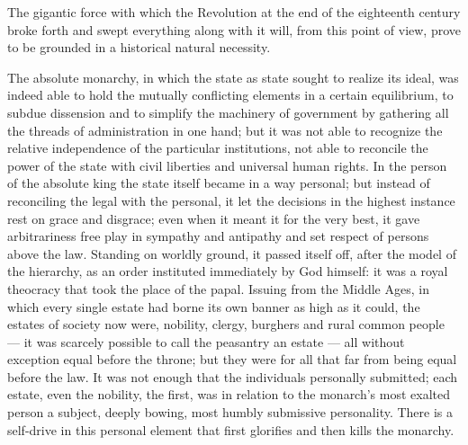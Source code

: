 \documentclass[12pt,a4paper,openany]{book}
\newcommand{\opage}[1]{\marginnote{\footnotesize\textit{[#1]}}}
\begin{document}
The gigantic force with which the Revolution at the end of the eighteenth century
broke forth and swept everything
along with it will, from this point of view, prove to be grounded
in a historical natural necessity.

The absolute monarchy, in which the state as state sought
to realize its ideal, was indeed able to hold the
mutually conflicting elements in a certain equilibrium, to subdue dissension
and to simplify the machinery of government by
gathering all the threads of administration in one hand; but it was
not able to recognize the relative independence of the particular institutions,
not able to reconcile the power of the state
with civil liberties and universal human
rights. In the person of the absolute king the state
itself became in a way personal; but instead of reconciling
the legal with the personal, it let the decisions
in the highest instance rest on grace and disgrace; even when
it meant it for the very best, it gave arbitrariness
free play in sympathy and antipathy and set respect of persons
\setcounter{footnote}{0}%
\opage{308}above the law. Standing on worldly ground, it
passed itself off, after the model of the hierarchy, as an order instituted
immediately by God himself: it was a royal theocracy
that took the place of the papal. Issuing from the Middle Ages,
in which every single estate had borne its own banner
as high as it could, the estates of society now were,
nobility, clergy, burghers and rural common people --- it was scarcely
possible to call the peasantry an estate --- all without
exception equal before the throne; but they were for all that far
from being equal before the law. It was not enough that the individuals
personally submitted; each estate, even
the nobility, the first, was in relation to the monarch's most exalted
person a subject, deeply bowing, most humbly submissive
personality. There is a self-drive in this personal element that
first glorifies and then kills the monarchy.
\end{document}
